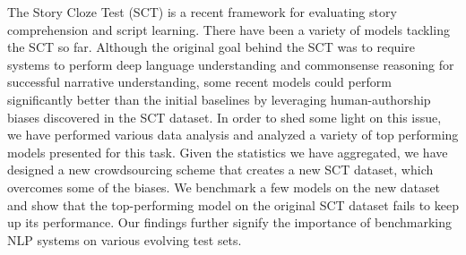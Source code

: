 The Story Cloze Test (SCT) is a recent framework for evaluating story comprehension and script learning. There have been a variety of models tackling the SCT so far. Although the original goal behind the SCT was to require systems to perform deep language understanding and commonsense reasoning for successful narrative understanding, some recent models could perform significantly better than the initial baselines by leveraging human-authorship biases discovered in the SCT dataset. In order to shed some light on this issue, we have performed various data analysis and analyzed a variety of top performing models presented for this task. Given the statistics we have aggregated, we have designed a new crowdsourcing scheme that creates a new SCT dataset, which overcomes some of the biases. We benchmark a few models on the new dataset and show that the top-performing model on the original SCT dataset fails to keep up its performance. Our findings further signify the importance of benchmarking NLP systems on various evolving test sets.

